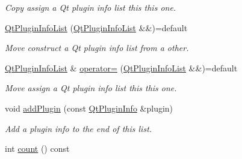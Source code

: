 \begin{DoxyCompactItemize}
\begin{DoxyCompactList}\small\item\em Copy assign a Qt plugin info list this this one. \end{DoxyCompactList}\item 
\hyperlink{class_mdt_1_1_deploy_utils_1_1_qt_plugin_info_list_a291517480793145e31bd0b8505db8d02}{Qt\+Plugin\+Info\+List} (\hyperlink{class_mdt_1_1_deploy_utils_1_1_qt_plugin_info_list}{Qt\+Plugin\+Info\+List} \&\&)=default\hypertarget{class_mdt_1_1_deploy_utils_1_1_qt_plugin_info_list_a291517480793145e31bd0b8505db8d02}{}\label{class_mdt_1_1_deploy_utils_1_1_qt_plugin_info_list_a291517480793145e31bd0b8505db8d02}

\begin{DoxyCompactList}\small\item\em Move construct a Qt plugin info list from a other. \end{DoxyCompactList}\item 
\hyperlink{class_mdt_1_1_deploy_utils_1_1_qt_plugin_info_list}{Qt\+Plugin\+Info\+List} \& \hyperlink{class_mdt_1_1_deploy_utils_1_1_qt_plugin_info_list_a3234c629a3c39ad423139cba4251a78f}{operator=} (\hyperlink{class_mdt_1_1_deploy_utils_1_1_qt_plugin_info_list}{Qt\+Plugin\+Info\+List} \&\&)=default\hypertarget{class_mdt_1_1_deploy_utils_1_1_qt_plugin_info_list_a3234c629a3c39ad423139cba4251a78f}{}\label{class_mdt_1_1_deploy_utils_1_1_qt_plugin_info_list_a3234c629a3c39ad423139cba4251a78f}

\begin{DoxyCompactList}\small\item\em Move assign a Qt plugin info list this this one. \end{DoxyCompactList}\item 
void \hyperlink{class_mdt_1_1_deploy_utils_1_1_qt_plugin_info_list_a191ce9aaed2ddc4d94578755f3067a3e}{add\+Plugin} (const \hyperlink{class_mdt_1_1_deploy_utils_1_1_qt_plugin_info}{Qt\+Plugin\+Info} \&plugin)
\begin{DoxyCompactList}\small\item\em Add a plugin info to the end of this list. \end{DoxyCompactList}\item 
int \hyperlink{class_mdt_1_1_deploy_utils_1_1_qt_plugin_info_list_af7b6d4fcf62d460222493faf6865d768}{count} () const \hypertarget{class_mdt_1_1_deploy_utils_1_1_qt_plugin_info_list_af7b6d4fcf62d460222493faf6865d768}{}\label{class_mdt_1_1_deploy_utils_1_1_qt_plugin_info_list_af7b6d4fcf62d460222493faf6865d768}


\end{DoxyCompactItemize}
